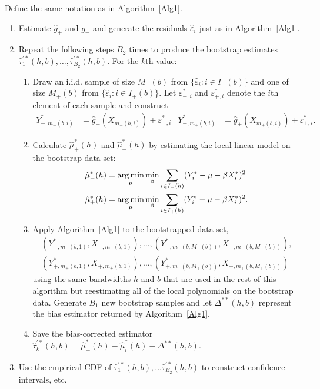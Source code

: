 \documentclass[12pt,fleqn]{article}
\begin{document}
\begin{algorithm}\label{Alg2}
  Define the same notation as in Algorithm~\ref{Alg1}.
  \begin{enumerate}
  \item Estimate $\hat g_+$ and $g_-$ and generate the residuals
    $\hat\varepsilon_i$ just as in Algorithm~\ref{Alg1}.
  \item Repeat the following steps $B_{2}$ times to produce the
    bootstrap estimates
    $\hat\tau_1^{\prime*}(h,b), \dots, \hat\tau_{B_{2}}^{\prime*}(h,b)$. For the
    $k$th value:
    \begin{enumerate}
    \item Draw an i.i.d. sample of size $M_-(b)$ from
      $\{\hat\varepsilon_i : i \in I_-(b)\}$ and one of size $M_+(b)$ from
      $\{\hat\varepsilon_i : i \in I_+(b)\}$. Let $\varepsilon_{-,i}^{*}$ and
      $\varepsilon_{+,i}^{*}$ denote the $i$th element of each sample and
      construct
      \begin{align*}
        Y_{-,m_-(b,i)}^* &= \hat g_-(X_{m_-(b,i)}) + \varepsilon_{-,i}^{*} &
        Y_{+,m_+(b,i)}^* &= \hat g_+(X_{m_{+}(b,i)}) + \varepsilon_{+,i}^{*}.
      \end{align*}
    \item Calculate $\hat\mu_+^*(h)$ and $\hat\mu_-^*(h)$ by estimating the
      local linear model on the bootstrap data set:
      \begin{align*}
        \hat\mu_-^*(h)
        &= \argmin_{\mu} \min_{\beta} \ssum[-]{i}{h}
          (Y_i^* - \mu - \beta X_i^*)^2 \\
        \hat\mu_+^*(h)
        &= \argmin_{\mu} \min_{\beta} \ssum[+]{i}{h}
          (Y_i^* - \mu - \beta X_i^*)^2.
      \end{align*}
    \item Apply Algorithm~\ref{Alg1} to the bootstrapped data set,
      \begin{multline*}
        (Y_{-,m_-(b,1)}^{*}, X_{-,m_-(b,1)}),\dots,
        (Y_{-,m_-(b,M_-(b))}^{*},X_{-,m_-(b,M_-(b))}), \\
        (Y_{+,m_+(b,1)}^{*}, X_{+,m_+(b,1)}),\dots,
        (Y_{+,m_+(b,M_+(b))}^{*},X_{+,m_+(b,M_+(b))})
      \end{multline*}
      using the same bandwidths $h$ and $b$ that are used in the rest of this
      algorithm but reestimating all of the local polynomials on the bootstrap
      data. Generate $B_1$ new bootstrap samples and let $\Delta^{**}(h,b)$
      represent the bias estimator returned by Algorithm~\ref{Alg1}.
    \item Save the bias-corrected estimator
      $\hat\tau_k^{\prime*}(h,b) = \hat\mu_+^*(h) - \hat\mu_i^*(h)
      - \Delta^{**}(h,b)$.
    \end{enumerate}
  \item Use the empirical CDF of
    $\hat\tau_1^{\prime*}(h,b),\dots \hat\tau_{B_2}^{\prime*}(h,b)$ to
    construct confidence intervals, etc.
  \end{enumerate}
\end{algorithm}
\end{document}
